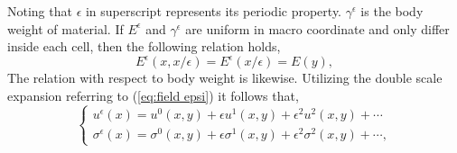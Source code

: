 Noting that $\epsilon$ in superscript represents its periodic property. $\gamma^{\epsilon}$ is the body weight of material. If $E^{\epsilon}$ and $\gamma^{\epsilon}$ are uniform in macro coordinate and only differ inside each cell, then the following relation holds,
\begin{equation}
E^{\epsilon}(x,x/\epsilon)=E^{\epsilon}(x/\epsilon)=E(y),
\end{equation}
The relation with respect to body weight is likewise. Utilizing the double scale expansion referring to (\ref{eq:field epsi}) it follows that,
\begin{equation}
\left\{
\begin{array}{l}
u^{\epsilon}(x) = u^{0}(x,y) + \epsilon u^{1}(x,y) + \epsilon^{2} u^{2}(x,y) + \cdots \\
\sigma^{\epsilon}(x) = \sigma^{0}(x,y) + \epsilon \sigma^{1}(x,y) + \epsilon^{2} \sigma^{2}(x,y) + \cdots,
\end{array}
\right.
\end{equation}

